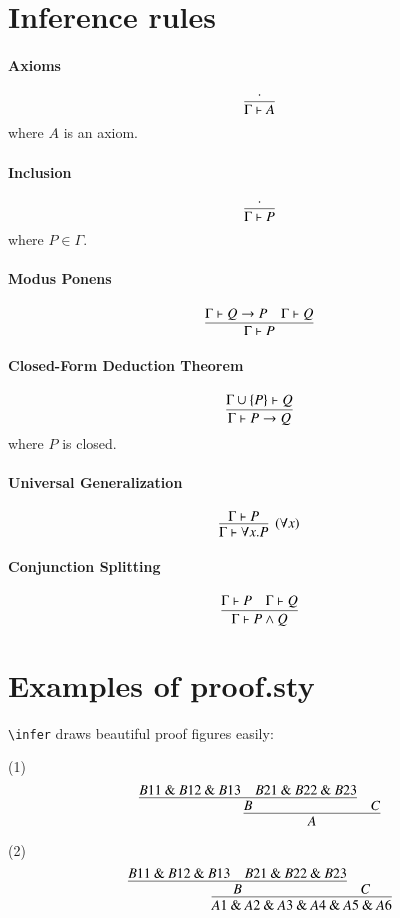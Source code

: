 \documentclass{article}
\def\land{\mathbin\&}
\begin{document}
\section{Inference rules}

\paragraph{Axioms}
$$
\infer{\Gamma \vdash A}{\cdot}
$$
where $A$ is an axiom. 

\paragraph{Inclusion}
$$
\infer{\Gamma \vdash P}{\cdot}
$$
where $P \in \Gamma$.

\paragraph{Modus Ponens}
$$
\infer{\Gamma \vdash P}
      {\Gamma \vdash Q \to P
      &\Gamma \vdash Q}
$$

\paragraph{Closed-Form Deduction Theorem}
$$
\infer{\Gamma \vdash P \to Q}
{\Gamma \cup \{P\} \vdash Q}
$$
where $P$ is closed.

\paragraph{Universal Generalization}
$$
\infer[(\forall x)]{\Gamma \vdash \forall x . P}
      {\Gamma \vdash P}
$$

\paragraph{Conjunction Splitting}
$$
\infer{\Gamma \vdash P \wedge Q}
      {\Gamma \vdash P
      &\Gamma \vdash Q}
$$



\section*{Examples of proof.sty}

\verb|\infer| draws beautiful proof figures easily:

\noindent (1)
$$
\infer{A}{
	\infer{B}{
		B11\land B12\land B13
		&
		B21\land B22\land B23
	}
	&
	C
}
$$

\noindent (2)
$$
\infer{A1\land A2\land A3\land A4\land A5\land A6}{
	\infer{B}{
		B11\land B12\land B13
		&
		B21\land B22\land B23
	}
	&
	C
}
$$
\end{document}
